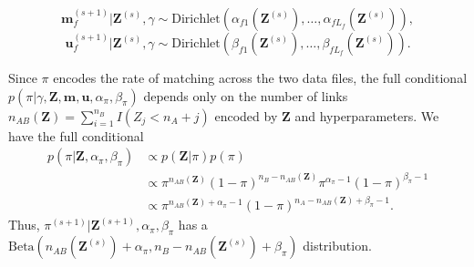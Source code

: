 \documentclass[ba]{imsart}
\begin{document}
$$\bm{m}_f^{(s+1)}|\bm{Z}^{(s)}, \gamma \sim \text{Dirichlet}(\alpha_{f1}(\bm{Z}^{(s)}), \ldots, \alpha_{fL_f}(\bm{Z}^{(s)})),$$
$$\bm{u}_f^{(s+1)}|\bm{Z}^{(s)}, \gamma \sim \text{Dirichlet}(\beta_{f1}(\bm{Z}^{(s)}), \ldots, \beta_{fL_f}(\bm{Z}^{(s)})).$$

Since $\pi$ encodes the rate of matching across the two data files, the full conditional $p(\pi|\gamma, \bm{Z}, \bm{m}, \bm{u}, \alpha_{\pi}, \beta_{\pi})$ depends only on the number of links $n_{AB}(\bm{Z}) = \sum_{i=1}^{n_B}I(Z_j < n_A + j)$ encoded by $\bm{Z}$ and hyperparameters. We have the full conditional
\begin{align*}
	p(\pi | \bm{Z}, \alpha_{\pi}, \beta_{\pi}) &\propto p(\bm{Z}|\pi)p(\pi) \\
	&\propto \pi^{n_{AB}(\bm{Z})} (1-\pi)^{n_B - n_{AB}(\bm{Z})} \pi^{\alpha_{\pi} -1} (1-\pi)^{\beta_{\pi} -1} \\
	&\propto \pi^{n_{AB}(\bm{Z}) + \alpha_{\pi} - 1} (1-\pi)^{n_A - n_{AB}(\bm{Z}) + \beta_{\pi} -1}.
\end{align*}
Thus, $\pi^{(s+1)}|\bm{Z}^{(s+1)},  \alpha_{\pi}, \beta_{\pi}$ has a $\text{Beta}(n_{AB}(\bm{Z}^{(s)}) + \alpha_{\pi}, n_B - n_{AB}(\bm{Z}^{(s)}) + \beta_{\pi})$ distribution.
\end{document}
